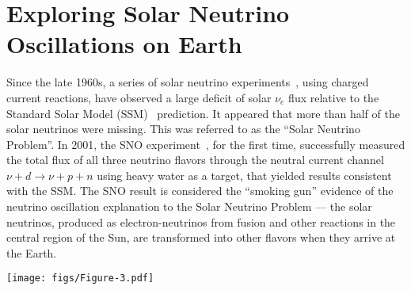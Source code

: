 \documentclass[aps,twocolumn,preprintnumbers,amsmath,superscriptaddress,amssymb,floats,nofootinbib]{revtex4-1}
\begin{document}
\newpage


\twocolumngrid


\section{Exploring Solar Neutrino Oscillations on Earth} 
\label{sec:kamland}

Since the late 1960s, a series of solar neutrino experiments~\cite{Homestake,GALLEX,SAGE,Kamiokande,Super-Kamiokande}, using charged current reactions, have observed a large deficit of solar $\nu_e$ flux relative to the Standard Solar Model (SSM)~\cite{Bahcall} prediction. 
It appeared that more than half of the solar neutrinos were missing. 
This was referred to as the ``Solar Neutrino Problem''. 
In 2001, the SNO experiment~\cite{SNO}, for the first time, successfully measured the total flux of all three neutrino flavors through the neutral current channel $\nu + d \to \nu + p + n$ using heavy water as a target, that yielded results consistent with the SSM. 
The SNO result is considered the ``smoking gun'' evidence of the neutrino oscillation explanation to the Solar Neutrino Problem --- the solar neutrinos, produced as electron-neutrinos from fusion and other reactions in the central region of the Sun, are transformed into other flavors when they arrive at the Earth.

\begin{figure*}[htb]
  \centering
  \texttt{[image: figs/Figure-3.pdf]}
  \caption{ \label{fig:kamland}{\bf Results from KamLAND.} (a) The data points show the measured prompt energy spectrum of $\bar\nu_e$ candidate events. The shaded histograms show the expected backgrounds. The expected reactor spectra without oscillation and with best-fit oscillation are shown as the dashed histogram. All histograms incorporate the energy-dependent selection efficiency, which is shown on the top. Only $\sim$60\% of reactor $\bar\nu_e$'s are observed relative to the no-oscillation expectation. 
  (b) The data points show the ratio of the background-subtracted
  $\bar\nu_e$ spectrum to the expectation for no-oscillation as a
  function of $L_{0}/E_{\nu}$. $L_{0}$ is the effective baseline taken as a
  flux-weighted average ($L_{0}$\,=\,180\,km). 
  The spectrum indicates almost two cycles of periodic feature as expected from neutrino oscillations. The oscillation survival probability using the best estimates of $\theta_{12}$ and $|\Delta{m}^2_{21}|$ is given by the blue curve. 
  The curve deviates from the perfect sinusoidal $L/E$ dependence since KamLAND has multiple baselines. Figures are reproduced, with permission, from Ref.~\cite{Kamland08}.
  }
\end{figure*}
\end{document}
